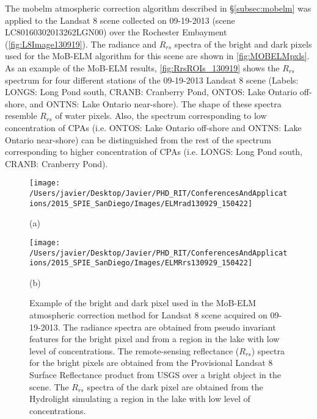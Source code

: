 The \gls{mobelm} atmospheric correction algorithm described in \S\ref{subsec:mobelm} was applied to the Landsat 8 scene collected on 09-19-2013 (scene LC80160302013262LGN00) over the Rochester Embayment (\autoref{fig:L8Image130919}). The radiance and $R_{rs}$ spectra of the bright and dark pixels used for the MoB-ELM algorithm for this scene are shown in \autoref{fig:MOBELMpxls}. As an example of the MoB-ELM results, \autoref{fig:RrsROIs_130919} shows the $R_{rs}$ spectrum for four different stations of the 09-19-2013 Landsat 8 scene  (Labels: LONGS: Long Pond south, CRANB: Cranberry Pond, ONTOS: Lake Ontario off-shore, and ONTNS: Lake Ontario near-shore). The shape of these spectra resemble $R_{rs}$ of water pixels. Also, the spectrum corresponding to low concentration of CPAs (i.e. ONTOS: Lake Ontario off-shore and ONTNS: Lake Ontario near-shore) can be distinguished from the rest of the spectrum corresponding to higher concentration of CPAs (i.e. LONGS: Long Pond south, CRANB: Cranberry Pond).

\begin{figure}[htb]
  \begin{minipage}[c]{0.48\linewidth}
    \centering
      \texttt{[image: /Users/javier/Desktop/Javier/PHD\_RIT/ConferencesAndApplications/2015\_SPIE\_SanDiego/Images/ELMrad130929\_150422]}
    \centerline{(a)}\medskip
  \end{minipage}
  \hfill
  \begin{minipage}[d]{0.48\linewidth}
    \centering
      \texttt{[image: /Users/javier/Desktop/Javier/PHD\_RIT/ConferencesAndApplications/2015\_SPIE\_SanDiego/Images/ELMRrs130929\_150422]}
    \centerline{(b)}\medskip
  \end{minipage}
  \caption[Example of the bright and dark pixel used in the MoB-ELM atmospheric correction method for Landsat 8 scene acquired on 09-19-2013.]{Example of the bright and dark pixel used in the MoB-ELM atmospheric correction method for Landsat 8 scene acquired on 09-19-2013. The radiance spectra are obtained from pseudo invariant features for the bright pixel and from a region in the lake with low level of concentrations. The remote-sensing reflectance ($R_{rs}$) spectra for the bright pixels are obtained from the Provisional Landsat 8 Surface Reflectance product from USGS over a bright object in the scene. The $R_{rs}$ spectra of the dark pixel are obtained from the Hydrolight simulating a region in the lake with low level of concentrations.\label{fig:MOBELMpxls} } 
\end{figure}

